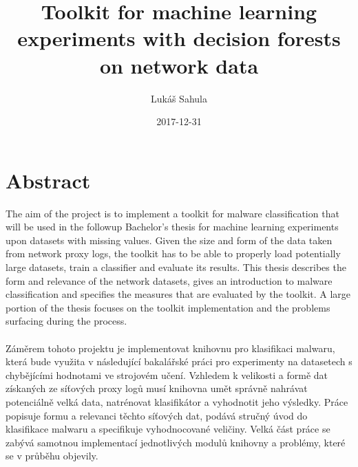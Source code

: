 \documentclass{article}
\title{Toolkit for machine learning experiments with decision forests on network data}
\date{2017-12-31}
\author{Lukáš Sahula}
\begin{document}
  \maketitle
  \newpage
  \section*{Abstract}
    The aim of the project is to implement a toolkit for malware classification that will be used in the followup Bachelor's thesis for machine learning experiments upon datasets with missing values. Given the size and form of the data taken from network proxy logs, the toolkit has to be able to properly load potentially large datasets, train a classifier and evaluate its results. This thesis describes the form and relevance of the network datasets, gives an introduction to malware classification and specifies the measures that are evaluated by the toolkit. A large portion of the thesis focuses on the toolkit implementation and the problems surfacing during the process.
    \\~\\
    Záměrem tohoto projektu je implementovat knihovnu pro klasifikaci malwaru, která bude využita v následující bakalářské práci pro experimenty na datasetech s chybějícími hodnotami ve strojovém učení. Vzhledem k velikosti a formě dat získaných ze síťových proxy logů musí knihovna umět správně nahrávat potenciálně velká data, natrénovat klasifikátor a vyhodnotit jeho výsledky. Práce popisuje formu a relevanci těchto síťových dat, podává stručný úvod do klasifikace malwaru a specifikuje vyhodnocované veličiny. Velká část práce se zabývá samotnou implementací jednotlivých modulů knihovny a problémy, které se v průběhu objevily.
  \newpage
  \tableofcontents
  \newpage
\end{document}
